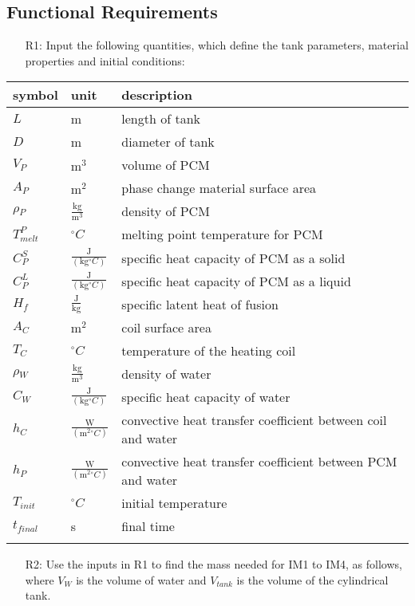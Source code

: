 \documentclass[12pt]{article}
\begin{document}
\subsection{Functional Requirements}
\label{Sec:FRs}
\begin{itemize}
\item[R1:]Input the following quantities, which define the tank parameters, material properties and initial conditions:
\end{itemize}
\begin{longtable*}{l l l}
\toprule
symbol & unit & description
\\
\midrule
$L$ & m & length of tank
\\
$D$ & m & diameter of tank
\\
$V_{P}$ & $\text{m}^{3}$ & volume of PCM
\\
$A_{P}$ & $\text{m}^{2}$ & phase change material surface area
\\
$\rho{}_{P}$ & $\frac{\text{kg}}{\text{m}^{3}}$ & density of PCM
\\
$T_{melt}^{P}$ & ${}^{\circ}C$ & melting point temperature for PCM
\\
$C_{P}^{S}$ & $\frac{\text{J}}{(\text{kg}{}^{\circ}C)}$ & specific heat capacity of PCM as a solid
\\
$C_{P}^{L}$ & $\frac{\text{J}}{(\text{kg}{}^{\circ}C)}$ & specific heat capacity of PCM as a liquid
\\
$H_{f}$ & $\frac{\text{J}}{\text{kg}}$ & specific latent heat of fusion
\\
$A_{C}$ & $\text{m}^{2}$ & coil surface area
\\
$T_{C}$ & ${}^{\circ}C$ & temperature of the heating coil
\\
$\rho{}_{W}$ & $\frac{\text{kg}}{\text{m}^{3}}$ & density of water
\\
$C_{W}$ & $\frac{\text{J}}{(\text{kg}{}^{\circ}C)}$ & specific heat capacity of water
\\
$h_{C}$ & $\frac{\text{W}}{(\text{m}^{2}{}^{\circ}C)}$ & convective heat transfer coefficient between coil and water
\\
$h_{P}$ & $\frac{\text{W}}{(\text{m}^{2}{}^{\circ}C)}$ & convective heat transfer coefficient between PCM and water
\\
$T_{init}$ & ${}^{\circ}C$ & initial temperature
\\
$t_{final}$ & s & final time
\\
\bottomrule
\label{Table:IVR}
\end{longtable*}
\begin{itemize}
\item[R2:]Use the inputs in R1 to find the mass needed for IM1 to IM4, as follows, where $V_{W}$ is the volume of water and $V_{tank}$ is the volume of the cylindrical tank.
\end{itemize}
\end{document}
